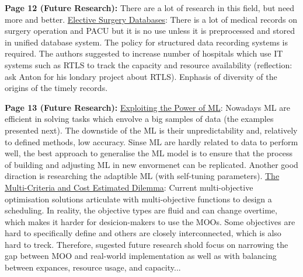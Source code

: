     \textbf{Page 12 (Future Research):}
    There are a lot of research in this field, but need more and better. \underline{Elective Surgery Databases}: There is a lot of medical records on surgery operation and PACU but it is no use unless it is preprocessed and stored in unified database system. The policy for structured data recording systems is required. The authors suggested to increase number of hospitals which use IT systems such as RTLS to track the capacity and resource availability (reflection: ask Anton for his londary project about RTLS). Enphasis of diversity of the origins of the timely records.
    
    \textbf{Page 13 (Future Research):}
    \underline{Exploiting the Power of ML}: Nowadays ML are efficient in solving tasks which envolve a big samples of data (the examples presented next). The downstide of the ML is their unpredictability and, relatively to defined methods, low accuracy. Sinse ML are hardly related to data to perform well, the best approach to generalise the ML model is to ensure that the process of building and adjusting ML in new envormenet can be replicated. Another good diraction is researching the adaptible ML (with self-tuning parameters). \underline{The Multi-Criteria and Cost Estimated Dilemma}: Current multi-objective optimisation solutions articulate with multi-objective functions to design a scheduling. In reality, the objective types are fluid and can change overtime, which makes it harder for desicion-makers to use the MOOs. Some objectives are hard to specifically define and others are closely interconnected, which is also hard to treck. Therefore, sugested future research shold focus on narrowing the gap between MOO and real-world implementation as well as with balancing between expances, resource usage, and capacity... 
    
